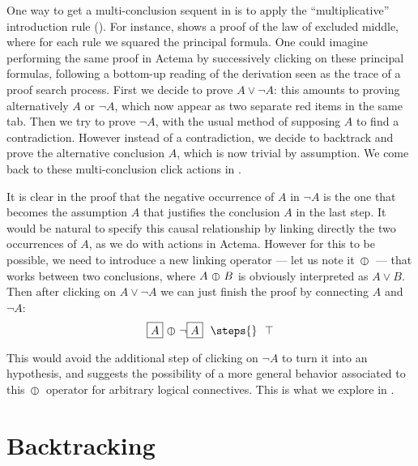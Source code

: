 One way to get a multi-conclusion sequent in  is to apply the
``multiplicative'' introduction rule {} (). For
instance,  shows a proof of the law of excluded middle, where for
each rule we squared the principal formula.
One could imagine performing the same proof in Actema by successively clicking
on these principal formulas, following a bottom-up reading of the  derivation seen as the trace of a proof search process. First we decide
to prove $A \lor \neg A$: this amounts to proving alternatively $A$ or $\neg
A$, which now appear as two separate red items in the same tab. Then we try to
prove $\neg A$, with the usual method of supposing $A$ to find a contradiction.
However instead of a contradiction, we decide to backtrack and prove the
alternative conclusion $A$, which is now trivial by assumption. We come back to
these multi-conclusion click actions in .

It is clear in the proof that the negative occurrence of $A$ in $\neg A$ is the
one that becomes the assumption $A$ that justifies the conclusion $A$ in the
last step. It would be natural to specify this causal relationship by linking
directly the two occurrences of $A$, as we do with  actions in Actema.
However for this to be possible, we need to introduce a new linking operator ---
let us note it $\operatorname{\,\varobar\,}$ --- that works between two conclusions, where $A \operatorname{\,\varobar\,} B$
is obviously interpreted as $A \lor B$. Then after clicking on $A \lor \neg A$
we can just finish the proof by connecting $A$ and $\neg A$:
$$\select{A} \para \neg \select{A} ~~\steps{}~~ \top$$

This would avoid the additional step of clicking on $\neg A$ to turn it into an
hypothesis, and suggests the possibility of a more general behavior
associated to this $\operatorname{\,\varobar\,}$ operator for arbitrary logical connectives. This is
what we explore in .

\section{Backtracking}


